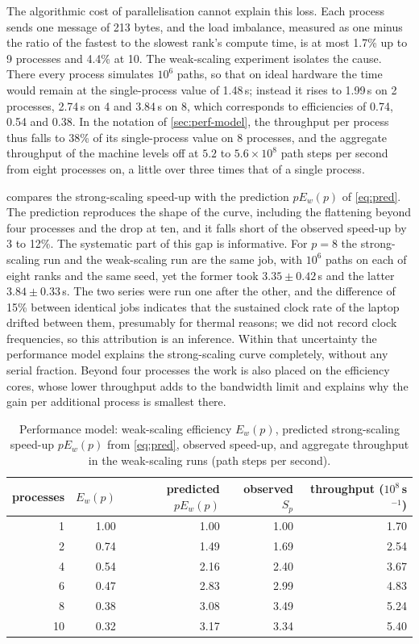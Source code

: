 \documentclass[11pt,a4paper]{article}
\begin{document}
The algorithmic cost of parallelisation cannot explain this loss.
Each process sends one message of 213 bytes, and the load imbalance, measured as one minus the ratio of the fastest to the slowest rank's compute time, is at most 1.7\% up to 9 processes and 4.4\% at 10.
The weak-scaling experiment isolates the cause.
There every process simulates $10^6$ paths, so that on ideal hardware the time would remain at the single-process value of 1.48\,s; instead it rises to 1.99\,s on 2 processes, 2.74\,s on 4 and 3.84\,s on 8, which corresponds to efficiencies of 0.74, 0.54 and 0.38.
In the notation of \cref{sec:perf-model}, the throughput per process thus falls to 38\% of its single-process value on 8 processes, and the aggregate throughput of the machine levels off at $5.2$ to $5.6\times10^8$ path steps per second from eight processes on, a little over three times that of a single process.

 compares the strong-scaling speed-up with the prediction $pE_w(p)$ of \cref{eq:pred}.
The prediction reproduces the shape of the curve, including the flattening beyond four processes and the drop at ten, and it falls short of the observed speed-up by 3 to 12\%.
The systematic part of this gap is informative.
For $p=8$ the strong-scaling run and the weak-scaling run are the same job, with $10^6$ paths on each of eight ranks and the same seed, yet the former took $3.35\pm0.42$\,s and the latter $3.84\pm0.33$\,s.
The two series were run one after the other, and the difference of 15\% between identical jobs indicates that the sustained clock rate of the laptop drifted between them, presumably for thermal reasons; we did not record clock frequencies, so this attribution is an inference.
Within that uncertainty the performance model explains the strong-scaling curve completely, without any serial fraction.
Beyond four processes the work is also placed on the efficiency cores, whose lower throughput adds to the bandwidth limit and explains why the gain per additional process is smallest there.

\begin{table}[ht]
\centering
\caption{Performance model: weak-scaling efficiency $E_w(p)$, predicted strong-scaling speed-up $pE_w(p)$ from \cref{eq:pred}, observed speed-up, and aggregate throughput in the weak-scaling runs (path steps per second).}\label{tab:model}
\small
\begin{tabular}{rrrrr}
\toprule
processes & $E_w(p)$ & predicted $pE_w(p)$ & observed $S_p$ & throughput ($10^8$\,s$^{-1}$) \\
\midrule
1 & 1.00 & 1.00 & 1.00 & 1.70 \\
2 & 0.74 & 1.49 & 1.69 & 2.54 \\
4 & 0.54 & 2.16 & 2.40 & 3.67 \\
6 & 0.47 & 2.83 & 2.99 & 4.83 \\
8 & 0.38 & 3.08 & 3.49 & 5.24 \\
10 & 0.32 & 3.17 & 3.34 & 5.40 \\
\bottomrule
\end{tabular}
\end{table}
\end{document}
